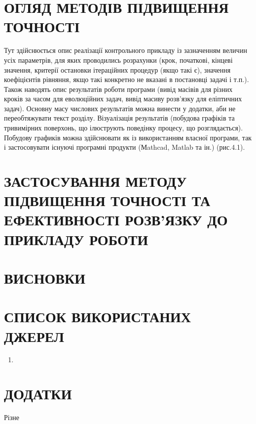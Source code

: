 \documentclass{article}
\begin{document}
    \newpage
    \section{ОГЛЯД МЕТОДІВ ПІДВИЩЕННЯ ТОЧНОСТІ}

        Тут здійснюється опис реалізації
        контрольного прикладу із зазначенням величин усіх параметрів, для яких
        проводились розрахунки (крок, початкові, кінцеві значення, критерії
        остановки ітераційних процедур (якщо такі є), значення коефіцієнтів
        рівняння, якщо такі конкретно не вказані в постановці задачі і т.п.). Також
        наводять опис результатів роботи програми (вивід масівів для різних кроків
        за часом для еволюційних задач, вивід масиву розв’язку для еліптичних
        задач). Основну масу числових результатів можна винести у додатки, аби не
        переобтяжувати текст розділу. Візуалізація результатів (побудова графіків та
        тривимірних поверхонь, що ілюструють поведінку процесу, що
        розглядається). Побудову графиків можна здійснювати як із використанням
        власної програми, так і застосовувати існуючі програмні продукти (Мathcad,
        Matlab та ін.) (рис.4.1).

    \newpage
    \section{ЗАСТОСУВАННЯ МЕТОДУ ПІДВИЩЕННЯ ТОЧНОСТІ ТА ЕФЕКТИВНОСТІ РОЗВ’ЯЗКУ ДО ПРИКЛАДУ РОБОТИ}
    \newpage
    \section{ВИСНОВКИ}
    \newpage
    \section{СПИСОК ВИКОРИСТАНИХ ДЖЕРЕЛ}
    \begin{enumerate}
        \item 
    \end{enumerate}
    \newpage
    \section{ДОДАТКИ}
        Різне
\end{document}
